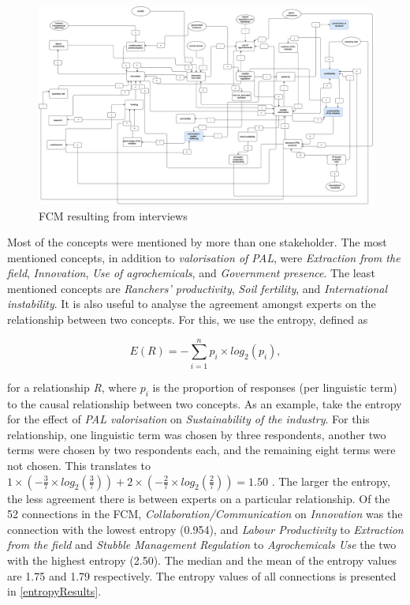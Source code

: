 \newpage

\begin{landscape}
\begin{figure}[H]
\caption{FCM resulting from interviews}  
\label{FCMdiagram}
\centering
\includegraphics[width=23 cm]{fig/diagram.drawio.pdf}
\end{figure}
\end{landscape}

\clearpage

Most of the concepts were mentioned by more than one stakeholder. The most mentioned concepts, in addition to \textit{valorisation of PAL}, were \textit{Extraction from the field}, \textit{Innovation}, \textit{Use of agrochemicals}, and \textit{Government presence}. The least mentioned concepts are \textit{Ranchers' productivity}, \textit{Soil fertility}, and \textit{International instability}. It is also useful to analyse the agreement amongst experts on the relationship between two concepts. For this, we use the entropy, defined as 

\begin{equation}
\label{entropyEq}
E(R) = - \sum_{i=1}^{n} p_i \times log_2(p_i),   
\end{equation}

for a relationship \textit{R}, where $p_i$ is the proportion of responses (per linguistic term) to the causal relationship between two concepts. As an example, take the entropy for the effect of \textit{PAL valorisation} on \textit{Sustainability of the industry}. For this relationship, one linguistic term was chosen by three respondents, another two terms were chosen by two respondents each, and the remaining eight terms were not chosen. This translates to $1 \times (- \frac{3}{7} \times log_2(\frac{3}{7})) + 2 \times (- \frac{2}{7} \times log_2(\frac{2}{7})) = 1.50 $ . The larger the entropy, the less agreement there is between experts on a particular relationship. Of the 52 connections in the FCM,  \textit{Collaboration/Communication} on \textit{Innovation} was the connection with the lowest entropy (0.954), and \textit{Labour Productivity} to \textit{Extraction from the field} and \textit{Stubble Management Regulation} to \textit{Agrochemicals Use} the two with the highest entropy (2.50). The median and the mean of the entropy values are 1.75 and 1.79 respectively. The entropy values of all connections is presented in \cref{entropyResults}.

